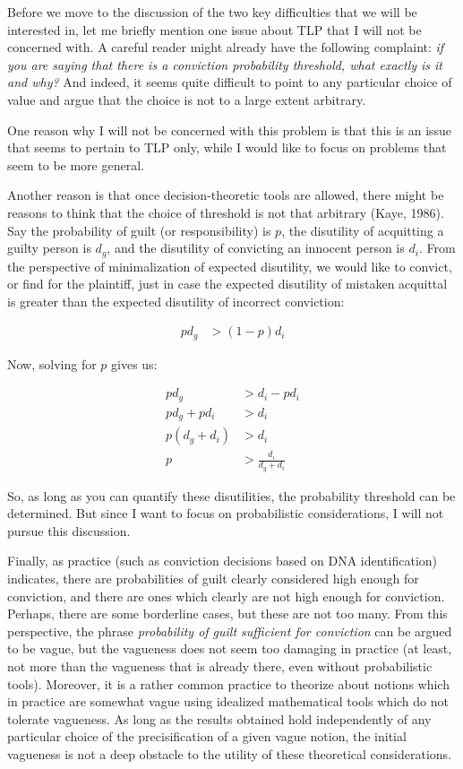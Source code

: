 \documentclass[10pt,dvipsnames,enabledeprecatedfontcommands]{scrartcl}
\begin{document}
Before we move to the discussion of the two key difficulties that we
will be interested in, let me briefly mention one issue about TLP that I
will not be concerned with. A careful reader might already have the
following complaint:
\emph{if you are saying that there is a conviction probability threshold, what exactly is it and why?}
And indeed, it seems quite difficult to point to any particular choice
of value and argue that the choice is not to a large extent arbitrary.

One reason why I will not be concerned with this problem is that this is
an issue that seems to pertain to TLP only, while I would like to focus
on problems that seem to be more general.

Another reason is that once decision-theoretic tools are allowed, there
might be reasons to think that the choice of threshold is not that
arbitrary (Kaye, 1986). Say the probability of guilt (or responsibility)
is \(p\), the disutility of acquitting a guilty person is \(d_g\), and
the disutility of convicting an innocent person is \(d_i\). From the
perspective of minimalization of expected disutility, we would like to
convict, or find for the plaintiff, just in case the expected disutility
of mistaken acquittal is greater than the expected disutility of
incorrect conviction:

\begin{align*}
p d_g &> (1-p)  d_i
\end{align*}

\noindent Now, solving for \(p\) gives us:

\begin{align*}
p d_g &> d_i - p d_i\\
p d_g + pd_i & > d_i \\
p(d_g+d_i)&>d_i\\
p & > \frac{d_i}{d_g+d_i}
\end{align*}

\noindent So, as long as you can quantify these disutilities, the
probability threshold can be determined. But since I want to focus on
probabilistic considerations, I will not pursue this discussion.

Finally, as practice (such as conviction decisions based on DNA
identification) indicates, there are probabilities of guilt clearly
considered high enough for conviction, and there are ones which clearly
are not high enough for conviction. Perhaps, there are some borderline
cases, but these are not too many. From this perspective, the phrase
\emph{probability of guilt sufficient for conviction} can be argued to
be vague, but the vagueness does not seem too damaging in practice (at
least, not more than the vagueness that is already there, even without
probabilistic tools). Moreover, it is a rather common practice to
theorize about notions which in practice are somewhat vague using
idealized mathematical tools which do not tolerate vagueness. As long as
the results obtained hold independently of any particular choice of the
precisification of a given vague notion, the initial vagueness is not a
deep obstacle to the utility of these theoretical considerations.
\end{document}

